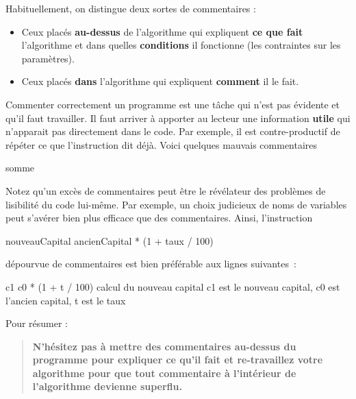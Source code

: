 			Habituellement, on distingue deux sortes de commentaires :
			\begin{itemize}
			\item
				Ceux placés \textbf{au-dessus} de l'algorithme
				qui expliquent \textbf{ce que fait} l'algorithme
				et dans quelles \textbf{conditions} il fonctionne
				(les contraintes sur les paramètres).
			\item
				Ceux placés \textbf{dans} l'algorithme
				qui expliquent \textbf{comment} il le fait.
			\end{itemize}
			
			Commenter correctement un programme
			est une tâche qui n'est pas évidente et qu'il faut travailler.
			Il faut arriver à apporter au lecteur
			une information \textbf{utile}
			qui n'apparait pas directement dans le code.
			Par exemple, il est contre-productif de répéter
			ce que l'instruction dit déjà.
			Voici quelques mauvais commentaires
			
			\begin{LDA}
				 
				\Let somme   
			\end{LDA}
			
			Notez qu’un excès de commentaires peut être le révélateur
			des problèmes de lisibilité du code lui-même.
			Par exemple, un choix judicieux de noms de variables 
			peut s’avérer bien plus efficace que des commentaires. 
			Ainsi, l’instruction
	
			\begin{LDA}
			\Let nouveauCapital \Gets ancienCapital * (1 + taux / 100)
			\end{LDA}
	
			dépourvue de commentaires est bien préférable aux lignes suivantes~:
	
			\begin{LDA}
			\Let c1 \Gets c0 * (1 + t / 100) \RComment calcul du nouveau capital
			\Empty \RComment c1 est le nouveau capital, c0 est l’ancien capital, t est le taux
			\end{LDA}
			
			Pour résumer :
			\begin{quote}
				\bfseries
				N'hésitez pas à mettre des commentaires
				au-dessus du programme pour expliquer ce qu'il fait
				et re-travaillez votre algorithme pour que tout
				commentaire à l'intérieur de l'algorithme
				devienne superflu.
			\end{quote}
			
